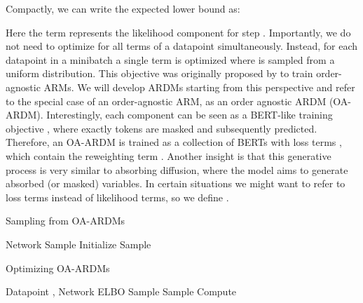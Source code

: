 \documentclass{article} \usepackage{iclr2022_conference,times}
\begin{document}
Compactly, we can write the expected lower bound as:

Here the term  represents the likelihood component for step . Importantly, we do not need to optimize for all  terms of a datapoint simultaneously. Instead, for each datapoint in a minibatch a single  term is optimized where  is sampled from a uniform distribution. This objective was originally proposed by \citet{uria2014adeeptractable} to train order-agnostic ARMs. We will develop ARDMs starting from this perspective and refer to the special case of an order-agnostic ARM, as an order agnostic ARDM (OA-ARDM). Interestingly, each  component can be seen as a BERT-like training objective \citep{devlin2019bert}, where exactly  tokens are masked and subsequently predicted. Therefore, an OA-ARDM is trained as a collection of  BERTs with loss terms , which contain the reweighting term . Another insight is that this generative process is very similar to absorbing diffusion, where the model aims to generate absorbed (or masked) variables. In certain situations we might want to refer to loss terms instead of likelihood terms, so we define . 

\begin{table}
\vspace{-.3cm}
\begin{minipage}[t]{.47\textwidth}
\begin{algorithm}[H]
   \caption{Sampling from OA-ARDMs}
   \label{alg:sample_ardms}
\begin{algorithmic}
 Network 
    Sample 
\STATE Initialize 
\STATE Sample 
\STATE  {} 
    \STATE  
    \STATE 
\ENDFOR
\end{algorithmic}
\end{algorithm}
\end{minipage}
\hfill
\begin{minipage}[t]{.47\textwidth}
\begin{algorithm}[H]
   \caption{Optimizing OA-ARDMs}
   \label{alg:optimize_ardms}
\begin{algorithmic}
    Datapoint , Network 
    ELBO 
\STATE Sample 
\STATE Sample 
\STATE Compute 
\STATE 
\STATE 
\STATE 
\end{algorithmic}
\end{algorithm}
\end{minipage}
\vspace{-.5cm}
\end{table}
\end{document}
